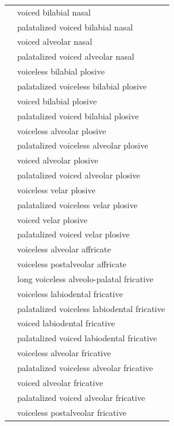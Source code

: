 \documentclass{article}
\begin{document}
\begin{xltabular}{\textwidth}{lL}
   & voiced bilabial nasal \\
   & palatalized voiced bilabial nasal \\
   & voiced alveolar nasal \\
   & palatalized voiced alveolar nasal \\
   & voiceless bilabial plosive \\
   & palatalized voiceless bilabial plosive \\
   & voiced bilabial plosive \\
   & palatalized voiced bilabial plosive \\
   & voiceless alveolar plosive \\
   & palatalized voiceless alveolar plosive \\
   & voiced alveolar plosive \\
   & palatalized voiced alveolar plosive \\
   & voiceless velar plosive \\
   & palatalized voiceless velar plosive \\
   & voiced velar plosive \\
   & palatalized voiced velar plosive \\
   & voiceless alveolar affricate \\
   & voiceless postalveolar affricate \\
   & long voiceless alveolo-palatal fricative \\
   & voiceless labiodental fricative \\
   & palatalized voiceless labiodental fricative \\
   & voiced labiodental fricative \\
   & palatalized voiced labiodental fricative \\
   & voiceless alveolar fricative \\
   & palatalized voiceless alveolar fricative \\
   & voiced alveolar fricative \\
   & palatalized voiced alveolar fricative \\
   & voiceless postalveolar fricative \\

\end{xltabular}
\end{document}
